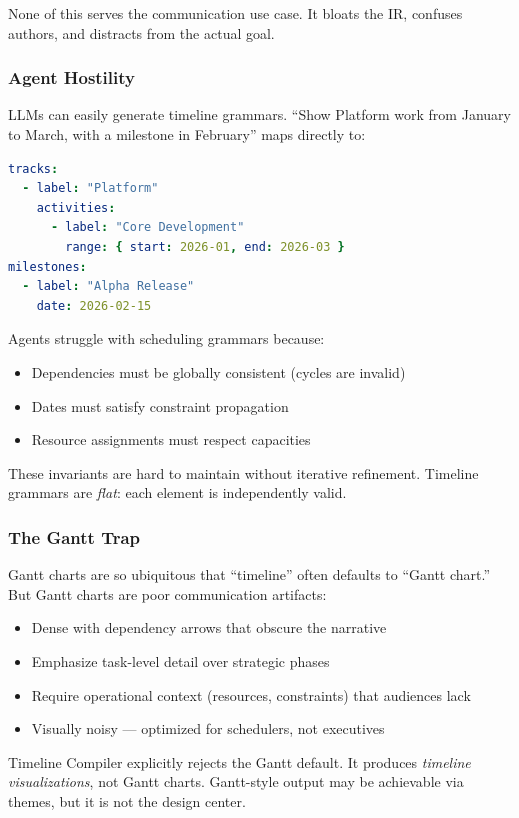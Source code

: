 None of this serves the communication use case. It bloats the IR, confuses authors, and distracts from the actual goal.

\subsubsection{Agent Hostility}

LLMs can easily generate timeline grammars. ``Show Platform work from January to March, with a milestone in February'' maps directly to:
\begin{lstlisting}[language=yaml]
tracks:
  - label: "Platform"
    activities:
      - label: "Core Development"
        range: { start: 2026-01, end: 2026-03 }
milestones:
  - label: "Alpha Release"
    date: 2026-02-15
\end{lstlisting}

Agents struggle with scheduling grammars because:
\begin{itemize}
  \item Dependencies must be globally consistent (cycles are invalid)
  \item Dates must satisfy constraint propagation
  \item Resource assignments must respect capacities
\end{itemize}

These invariants are hard to maintain without iterative refinement. Timeline grammars are \emph{flat}: each element is independently valid.

\subsubsection{The Gantt Trap}

Gantt charts are so ubiquitous that ``timeline'' often defaults to ``Gantt chart.'' But Gantt charts are poor communication artifacts:
\begin{itemize}
  \item Dense with dependency arrows that obscure the narrative
  \item Emphasize task-level detail over strategic phases
  \item Require operational context (resources, constraints) that audiences lack
  \item Visually noisy — optimized for schedulers, not executives
\end{itemize}

Timeline Compiler explicitly rejects the Gantt default. It produces \emph{timeline visualizations}, not Gantt charts. Gantt-style output may be achievable via themes, but it is not the design center.

